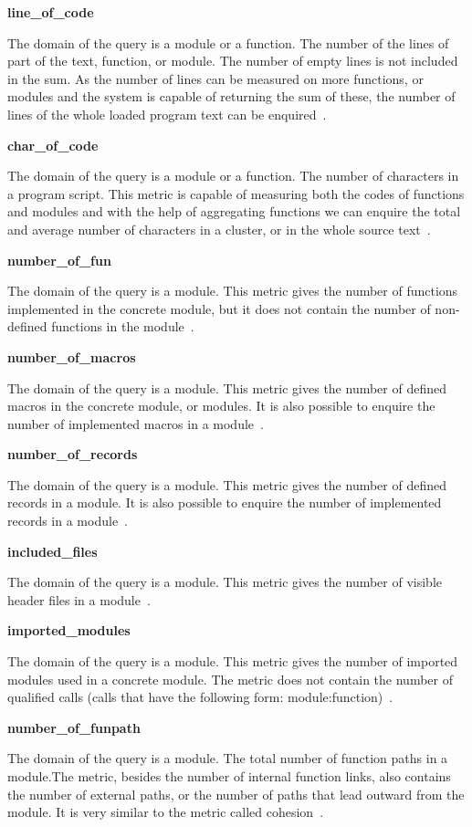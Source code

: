 \textbf{line\_of\_code}

The domain of the query is a module or a function. The number of the lines of part of the text, function, or module. The number of empty lines is not included in the sum. As the number of lines can be measured on more functions, or modules and the system is capable of returning the sum of these, the number of lines of the whole loaded program text can be enquired~\cite{refactorerl}.

\textbf{char\_of\_code}

The domain of the query is a module or a function. The number of characters in a program script. This metric is capable of measuring both the codes of functions and modules and with the help of aggregating functions we can enquire the total and average number of characters in a cluster, or in the whole source text~\cite{refactorerl}.

\textbf{number\_of\_fun}

The domain of the query is a module. This metric gives the number of functions
implemented in the concrete module, but it does not contain the number of non-defined functions in the module~\cite{refactorerl}.

\textbf{number\_of\_macros}

The domain of the query is a module. This metric gives the number of defined macros in the concrete module, or modules. It is also possible to enquire the number of implemented macros in a module~\cite{refactorerl}.

\textbf{number\_of\_records}

The domain of the query is a module. This metric gives the number of defined records in a module. It is also possible to enquire the number of implemented records in a module~\cite{refactorerl}.

\textbf{included\_files}

The domain of the query is a module. This metric gives the number of visible header files in a module~\cite{refactorerl}.

\textbf{imported\_modules}

The domain of the query is a module. This metric gives the number of imported modules used in a concrete module. The metric does not contain the number of qualified calls (calls that have the following form: module:function)~\cite{refactorerl}.

\textbf{number\_of\_funpath}

The domain of the query is a module. The total number of function paths in a module.The metric, besides the number of internal function links, also contains the number of external paths, or the number of paths that lead outward from the module. It is very similar to the metric called cohesion~\cite{refactorerl}.

